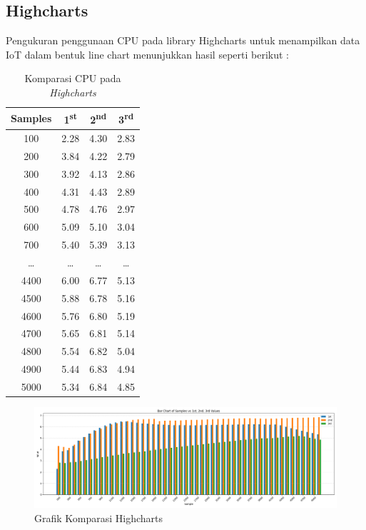 \subsection{Highcharts}
Pengukuran penggunaan CPU pada library Highcharts untuk menampilkan data IoT dalam bentuk line chart menunjukkan hasil seperti berikut : 
\begin{table}[H]
	\centering
	\caption{Komparasi CPU pada \textit{Highcharts}}
	\begin{tabular}{|c|c|c|c|}
		\hline
		\textbf{Samples} & \textbf{1\textsuperscript{st}} & \textbf{2\textsuperscript{nd}} & \textbf{3\textsuperscript{rd}} \\
		\hline
		100  & 2.28 & 4.30 & 2.83 \\
		200  & 3.84 & 4.22 & 2.79 \\
		300  & 3.92 & 4.13 & 2.86 \\
		400  & 4.31 & 4.43 & 2.89 \\
		500  & 4.78 & 4.76 & 2.97 \\
		600  & 5.09 & 5.10 & 3.04 \\
		700  & 5.40 & 5.39 & 3.13 \\
		\ldots & \ldots & \ldots & \ldots \\
		4400 & 6.00 & 6.77 & 5.13 \\
		4500 & 5.88 & 6.78 & 5.16 \\
		4600 & 5.76 & 6.80 & 5.19 \\
		4700 & 5.65 & 6.81 & 5.14 \\
		4800 & 5.54 & 6.82 & 5.04 \\
		4900 & 5.44 & 6.83 & 4.94 \\
		5000 & 5.34 & 6.84 & 4.85 \\
		\hline
	\end{tabular}
\end{table}

	\begin{figure}[H]
	\centering
	\includegraphics[width=0.8\linewidth]{gambar/Pembahasan/FIX_CPU/hc_compare.png}
	\caption{Grafik Komparasi Highcharts}
	\label{Grafik Komparasi Highcharts}
\end{figure}

